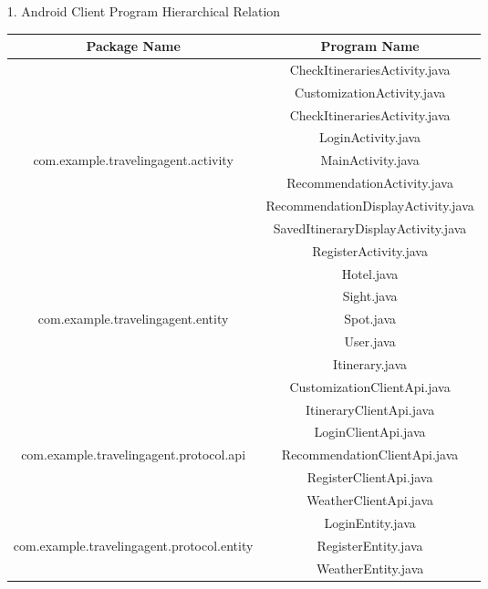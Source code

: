 \documentclass[10pt]{article}
\begin{document}
\begin{itemize}
	\item[1.] Android Client Program Hierarchical Relation
	 
		\begin{table}[htb]
			\centering
		
			\begin{tabular}{c|c} 
				\hline 
				Package Name&Program Name\\
				\hline
				&CheckItinerariesActivity.java\\
				\cline{2-2}
				&CustomizationActivity.java\\
				\cline{2-2}
				&CheckItinerariesActivity.java\\
				\cline{2-2}
				&LoginActivity.java\\
				\cline{2-2}
				com.example.travelingagent.activity&MainActivity.java\\
				\cline{2-2}
				&RecommendationActivity.java\\
				\cline{2-2}
				&RecommendationDisplayActivity.java\\
				\cline{2-2}
				&SavedItineraryDisplayActivity.java\\
				\cline{2-2}
				&RegisterActivity.java\\
				\hline
				&Hotel.java\\
				\cline{2-2}
				&Sight.java\\
				\cline{2-2}
				com.example.travelingagent.entity&Spot.java\\
				\cline{2-2}
				&User.java\\
				\cline{2-2}
				&Itinerary.java\\
				\hline
				&CustomizationClientApi.java\\
				\cline{2-2}
				&ItineraryClientApi.java\\
				\cline{2-2}
				&LoginClientApi.java\\
				\cline{2-2}
				com.example.travelingagent.protocol.api&RecommendationClientApi.java\\
				\cline{2-2}
				&RegisterClientApi.java\\
				\cline{2-2}
				&WeatherClientApi.java\\
				\hline
				&LoginEntity.java\\
				\cline{2-2}
				com.example.travelingagent.protocol.entity&RegisterEntity.java\\
				\cline{2-2}
				&WeatherEntity.java\\
				\hline
			\end{tabular}   
			

\end{table}
\end{itemize}
\end{document}
